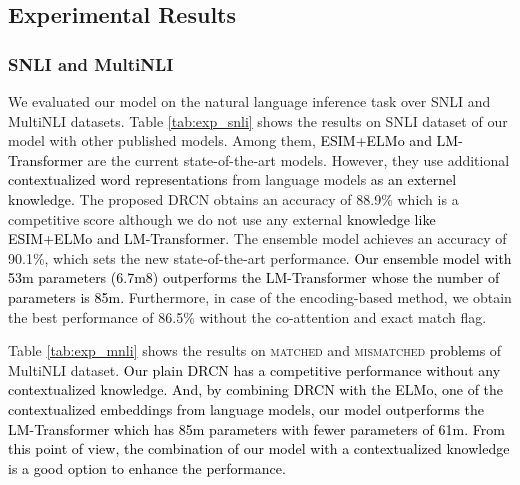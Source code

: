 \documentclass[letterpaper]{article} \usepackage{aaai19}  \usepackage{times}  \usepackage{helvet}  \usepackage{courier}  \usepackage{url}  \usepackage{graphicx}  \frenchspacing  \setlength{\pdfpagewidth}{8.5in}  \setlength{\pdfpageheight}{11in}
\newcommand\sh[1]{\textcolor{black}{#1}}
\newcommand\shh[1]{\textcolor{black}{#1}}
\newcommand\nj[1]{\textcolor{black}{#1}}
\begin{document}
\subsection{Experimental Results}

\subsubsection{SNLI and MultiNLI}

We evaluated our model on the natural language inference task over SNLI and MultiNLI datasets. Table \ref{tab:exp_snli} shows the results on SNLI dataset of our model with other published models.
Among them, \shh{ESIM+ELMo and LM-Transformer} are the current state-of-the-art models. 
However, 
they use additional 
\sh{contextualized word representations} from language models 
\shh{as an externel knowledge.} 
The proposed DRCN obtains an accuracy of 88.9\% which is a competitive score although we do not use any external \shh{knowledge like ESIM+ELMo and LM-Transformer}. The ensemble model achieves an accuracy of 90.1\%, which sets the new state-of-the-art performance. 
\shh{Our ensemble model with 53m parameters (6.7m8) outperforms the LM-Transformer whose the number of parameters is 85m.}
Furthermore, in case of the encoding-based method, we obtain the best performance of 86.5\% without the co-attention and exact match flag. 

Table \ref{tab:exp_mnli} shows the results on \textsc{matched} and \textsc{mismatched} \nj{problems} of MultiNLI dataset. 
\shh{Our plain DRCN has a competitive performance without any contextualized knowledge. And, by combining DRCN with the ELMo, one of the contextualized embeddings from language models, our model outperforms the LM-Transformer which has 85m parameters with fewer parameters \shh{of 61m}. From this point of view, the combination of our model with a contextualized knowledge is a good option to enhance the performance.}
\end{document}
